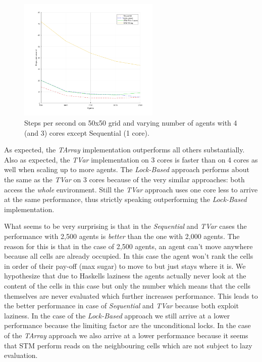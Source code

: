 \begin{figure}
	\centering
	\includegraphics[width=0.6\textwidth, angle=0]{./fig/concurrentabs/sugarscape/varying_agents.png}
	\caption{Steps per second on 50x50 grid and varying number of agents with 4 (and 3) cores except Sequential (1 core).}
	\label{fig:state_results_agentsscale_time}
\end{figure}

As expected, the \textit{TArray} implementation outperforms all others substantially. Also as expected, the \textit{TVar} implementation on 3 cores is faster than on 4 cores as well when scaling up to more agents. The \textit{Lock-Based} approach performs about the same as the \textit{TVar} on 3 cores because of the very similar approaches: both access the \textit{whole} environment. Still the \textit{TVar} approach uses one core less to arrive at the same performance, thus strictly speaking outperforming the \textit{Lock-Based} implementation.

What seems to be very surprising is that in the \textit{Sequential} and \textit{TVar} cases the performance with 2,500 agents is \textit{better} than the one with 2,000 agents. The reason for this is that in the case of 2,500 agents, an agent can't move anywhere because all cells are already occupied. In this case the agent won't rank the cells in order of their pay-off (max sugar) to move to but just stays where it is. We hypothesize that due to Haskells laziness the agents actually never look at the content of the cells in this case but only the number which means that the cells themselves are never evaluated which further increases performance. This leads to the better performance in case of \textit{Sequential} and \textit{TVar} because both exploit laziness.
In the case of the \textit{Lock-Based} approach we still arrive at a lower performance because the limiting factor are the unconditional locks. In the case of the \textit{TArray} approach we also arrive at a lower performance because it seems that STM perform reads on the neighbouring cells which are not subject to lazy evaluation.

